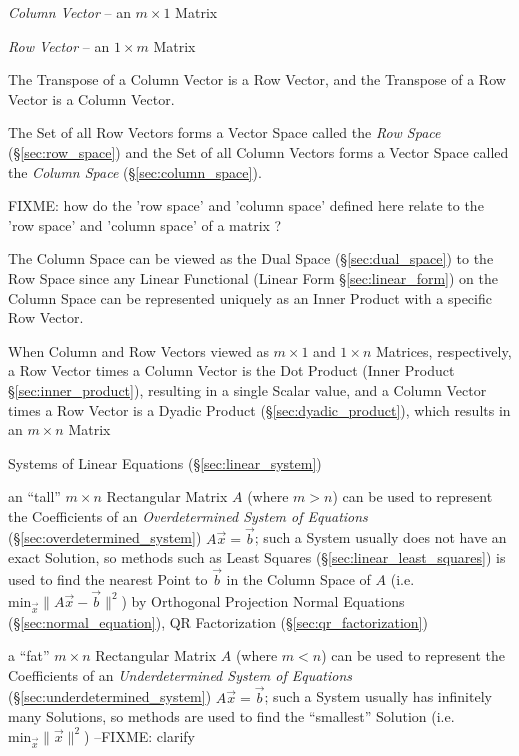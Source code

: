 \emph{Column Vector} -- an $m \times 1$ Matrix

\emph{Row Vector} -- an $1 \times m$ Matrix

The Transpose of a Column Vector is a Row Vector, and the Transpose of a Row
Vector is a Column Vector.

The Set of all Row Vectors forms a Vector Space called the \emph{Row Space}
(\S\ref{sec:row_space}) and the Set of all Column Vectors forms a Vector Space
called the \emph{Column Space} (\S\ref{sec:column_space}).

FIXME: how do the 'row space' and 'column space' defined here relate to the
'row space' and 'column space' of a matrix ?

The Column Space can be viewed as the Dual Space (\S\ref{sec:dual_space}) to
the Row Space since any Linear Functional (Linear Form \S\ref{sec:linear_form})
on the Column Space can be represented uniquely as an Inner Product with a
specific Row Vector.

When Column and Row Vectors viewed as $m \times 1$ and $1 \times n$ Matrices,
respectively, a Row Vector times a Column Vector is the Dot Product
(Inner Product \S\ref{sec:inner_product}), resulting in a single Scalar value,
and a Column Vector times a Row Vector is a Dyadic Product
(\S\ref{sec:dyadic_product}), which results in an $m \times n$ Matrix


Systems of Linear Equations (\S\ref{sec:linear_system})

an ``tall'' $m \times n$ Rectangular Matrix $A$ (where $m > n$) can be used to
represent the Coefficients of an \emph{Overdetermined System of Equations}
(\S\ref{sec:overdetermined_system}) $A\vec{x} = \vec{b}$; such a System usually
does not have an exact Solution, so methods such as Least Squares
(\S\ref{sec:linear_least_squares}) is used to find the nearest Point to
$\vec{b}$ in the Column Space of $A$ (i.e.  $\mathrm{min}_{\vec{x}} \|A\vec{x} -
\vec{b}\|^2$) by Orthogonal Projection \fist Normal Equations
(\S\ref{sec:normal_equation}), QR Factorization (\S\ref{sec:qr_factorization})

a ``fat'' $m \times n$ Rectangular Matrix $A$ (where $m < n$) can be used to
represent the Coefficients of an \emph{Underdetermined System of Equations}
(\S\ref{sec:underdetermined_system}) $A\vec{x} = \vec{b}$; such a System
usually has infinitely many Solutions, so methods are used to find the
``smallest'' Solution (i.e. $\mathrm{min}_{\vec{x}} \|\vec{x}\|^2$)
--FIXME: clarify


\asterism

